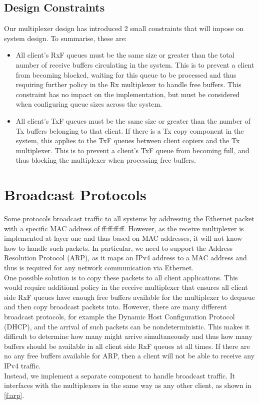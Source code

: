 \subsection{Design Constraints}

Our multiplexer design has introduced 2 small constraints that will impose on system design. To summarise,
these are:

\begin{itemize}
    \item All client's RxF queues must be the same size or greater than the total number of receive buffers circulating in the system. 
        This is to prevent a client from becoming blocked, waiting for this queue to be processed and thus requiring further policy 
        in the Rx multiplexer to handle free buffers. This constraint has no impact on the implementation, but must be considered 
        when configuring queue sizes across the system. 
    \item All client's TxF queues must be the same size or greater than the number of Tx buffers belonging to that client. If there is a 
        Tx copy component in the system, this applies to the TxF queues between client copiers and the Tx multiplexer. 
        This is to prevent a client's TxF queue from becoming full, and thus blocking the multiplexer when processing free buffers. 
\end{itemize}

\section{Broadcast Protocols}\label{s:arp}
Some protocols broadcast traffic to all systems by addressing the
Ethernet packet with a specific MAC address of ff:ff:ff:ff. However,
as the receive multiplexer is implemented at layer one and thus based on MAC addresses,
it will not know how to handle such packets. In particular, we need to support 
the Address Resolution Protocol (ARP), as it maps an
IPv4 address to a MAC address and thus 
is required for any network communication via Ethernet.\\
One possible solution is to copy these packets to all client applications.
This would require additional policy in the receive multiplexer that ensures
all client side RxF queues have enough free buffers available
for the multiplexer to dequeue and then copy broadcast packets into.
However, there are many different broadcast protocols, for example the Dynamic
Host Configuration Protocol (DHCP), and the arrival of such packets
can be nondeterministic. This makes it difficult to determine how many might arrive
simultaneously and thus how many buffers should be available in all client side
RxF queues at all times. If there are no any free buffers available for ARP, then
a client will not be able to receive any IPv4 traffic.\\
Instead, we implement a separate component to handle broadcast traffic. It interfaces
with the multiplexers in the same way as any other client, as shown in \autoref{f:arp}. 

